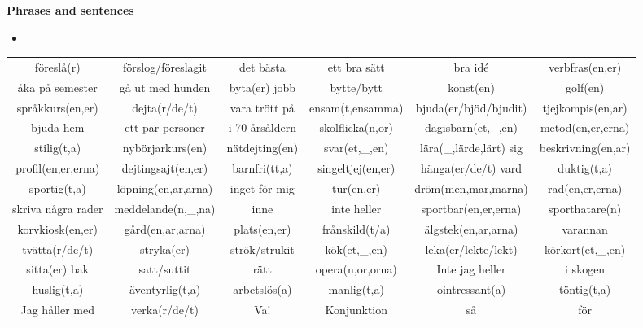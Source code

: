 
\begin{flushleft}
    \textbf{Phrases and sentences}
    \begin{itemize}
        \item 
    \end{itemize}
\end{flushleft}

\begin{center}
    \begin{adjustwidth}{-2.5cm}{}
        \begin{tabular}{|c c c c c c|}
            \hline
            föreslå(r) & förslog/föreslagit & det bästa & ett bra sätt & bra id\'e & verbfras(en,er) \\
            åka på semester & gå ut med hunden & byta(er) jobb & bytte/bytt & konst(en) & golf(en) \\
            språkkurs(en,er) & dejta(r/de/t) & vara trött på & ensam(t,ensamma) & bjuda(er/bjöd/bjudit) & tjejkompis(en,ar) \\
            bjuda hem & ett par personer & i 70-årsåldern & skolflicka(n,or) & dagisbarn(et,\_,en) & metod(en,er,erna) \\
            stilig(t,a) & nybörjarkurs(en) & nätdejting(en) & svar(et,\_,en) & lära(\_,lärde,lärt) sig & beskrivning(en,ar) \\
            profil(en,er,erna) & dejtingsajt(en,er) & barnfri(tt,a) & singeltjej(en,er) & hänga(er/de/t) vard & duktig(t,a) \\
            sportig(t,a) & löpning(en,ar,arna) & inget för mig & tur(en,er) & dröm(men,mar,marna) & rad(en,er,erna) \\
            skriva några rader & meddelande(n,\_,na) & inne & inte heller & sportbar(en,er,erna) & sporthatare(n) \\
            korvkiosk(en,er) & gård(en,ar,arna) & plats(en,er) & frånskild(t/a) & älgstek(en,ar,arna) & varannan \\
            tvätta(r/de/t) & stryka(er) & strök/strukit & kök(et,\_,en) & leka(er/lekte/lekt) & körkort(et,\_,en) \\
            sitta(er) bak & satt/suttit & rätt & opera(n,or,orna) & Inte jag heller & i skogen \\
            huslig(t,a) & äventyrlig(t,a) & arbetslös(a) & manlig(t,a) & ointressant(a) & töntig(t,a) \\
            Jag håller med & verka(r/de/t) & Va! & Konjunktion & så & för \\

\end{tabular}
\end{adjustwidth}
\end{center}
